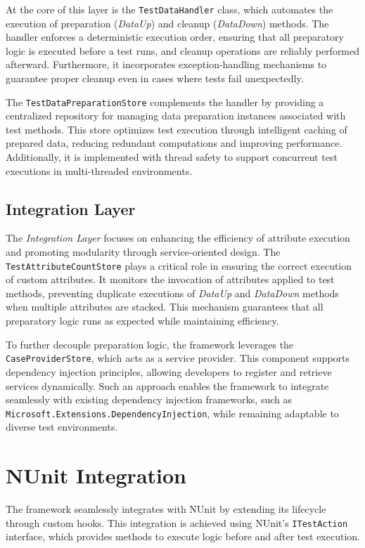 At the core of this layer is the \texttt{TestDataHandler} class, which automates the execution of preparation (\textit{DataUp}) and cleanup (\textit{DataDown}) methods. The handler enforces a deterministic execution order, ensuring that all preparatory logic is executed before a test runs, and cleanup operations are reliably performed afterward. Furthermore, it incorporates exception-handling mechanisms to guarantee proper cleanup even in cases where tests fail unexpectedly.

The \texttt{TestDataPreparationStore} complements the handler by providing a centralized repository for managing data preparation instances associated with test methods. This store optimizes test execution through intelligent caching of prepared data, reducing redundant computations and improving performance. Additionally, it is implemented with thread safety to support concurrent test executions in multi-threaded environments.

\subsection{Integration Layer}
The \textit{Integration Layer} focuses on enhancing the efficiency of attribute execution and promoting modularity through service-oriented design.
The \texttt{TestAttributeCountStore} plays a critical role in ensuring the correct execution of custom attributes. It monitors the invocation of attributes applied to test methods, preventing duplicate executions of \textit{DataUp} and \textit{DataDown} methods when multiple attributes are stacked. This mechanism guarantees that all preparatory logic runs as expected while maintaining efficiency.

To further decouple preparation logic, the framework leverages the \texttt{CaseProviderStore}, which acts as a service provider. This component supports dependency injection principles, allowing developers to register and retrieve services dynamically. Such an approach enables the framework to integrate seamlessly with existing dependency injection frameworks, such as \texttt{Microsoft.Extensions.DependencyInjection}, while remaining adaptable to diverse test environments.

\section{NUnit Integration}
The framework seamlessly integrates with NUnit by extending its lifecycle through custom hooks. This integration is achieved using NUnit's \texttt{ITestAction} interface, which provides methods to execute logic before and after test execution.

